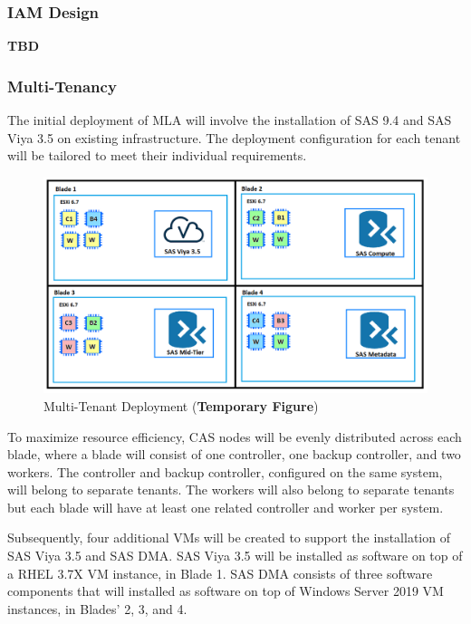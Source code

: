 \subsubsection{IAM Design}
\textbf{TBD}

\subsubsection{Multi-Tenancy}

The initial deployment of MLA will involve the installation of SAS 9.4 and SAS Viya 3.5 on existing infrastructure. The deployment configuration for each tenant will be tailored to meet their individual requirements. 

\begin{figure}[H]
    \centering
    \includegraphics[scale = 0.52]{images/initial-deployment-diagram.png}
    \caption{Multi-Tenant Deployment (\textbf{Temporary Figure})}
    \label{Initial Multi-Tenant Deployment}
\end{figure} 

To maximize resource efficiency, CAS nodes will be evenly distributed across each blade, where a blade will consist of one controller, one backup controller, and two workers. The controller and backup controller, configured on the same system, will belong to separate tenants. The workers will also belong to separate tenants but each blade will have at least one related controller and worker per system. 

Subsequently, four additional VMs will be created to support the installation of SAS Viya 3.5 and SAS DMA. SAS Viya 3.5 will be installed as software on top of a RHEL 3.7X VM instance, in Blade 1. SAS DMA consists of three software components that will installed as software on top of Windows Server 2019 VM instances, in Blades' 2, 3, and 4. 


